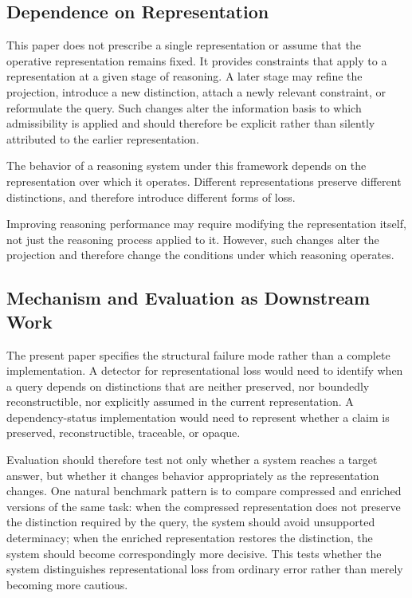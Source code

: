 \documentclass[11pt]{article}
\begin{document}
\subsection{Dependence on Representation}

This paper does not prescribe a single representation or assume that the operative representation remains fixed. It provides constraints that apply to a representation at a given stage of reasoning. A later stage may refine the projection, introduce a new distinction, attach a newly relevant constraint, or reformulate the query. Such changes alter the information basis to which admissibility is applied and should therefore be explicit rather than silently attributed to the earlier representation.

The behavior of a reasoning system under this framework depends on the representation over which it operates. Different representations preserve different distinctions, and therefore introduce different forms of loss.

Improving reasoning performance may require modifying the representation itself, not just the reasoning process applied to it. However, such changes alter the projection and therefore change the conditions under which reasoning operates.

\subsection{Mechanism and Evaluation as Downstream Work}

The present paper specifies the structural failure mode rather than a complete implementation. A detector for representational loss would need to identify when a query depends on distinctions that are neither preserved, nor boundedly reconstructible, nor explicitly assumed in the current representation. A dependency-status implementation would need to represent whether a claim is preserved, reconstructible, traceable, or opaque.

Evaluation should therefore test not only whether a system reaches a target answer, but whether it changes behavior appropriately as the representation changes. One natural benchmark pattern is to compare compressed and enriched versions of the same task: when the compressed representation does not preserve the distinction required by the query, the system should avoid unsupported determinacy; when the enriched representation restores the distinction, the system should become correspondingly more decisive. This tests whether the system distinguishes representational loss from ordinary error rather than merely becoming more cautious.
\end{document}
